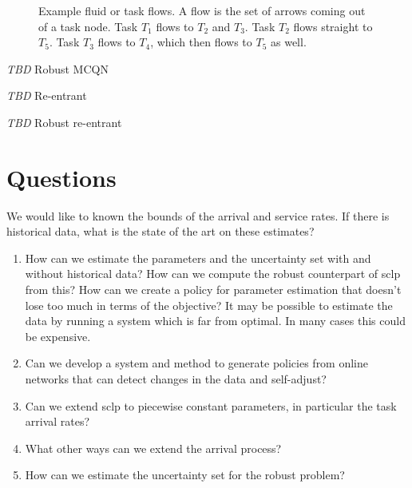 \documentclass[11pt,a4paper,titlepage]{article}
\newcommand\tbd{{\color{orange}\textit{TBD}}}
\theoremstyle{definition}
\begin{document}
\begin{figure}
    \centering
    \caption[Example fluid or task flows.]{
        \label{fig:task-flows}
        Example fluid or task flows.
        A flow is the set of arrows coming out of a task node.
        Task $T_1$ flows to $T_2$ and $T_3$.
        Task $T_2$ flows straight to $T_5$.
        Task $T_3$ flows to $T_4$,
        which then flows to $T_5$ as well.
    }
\end{figure}

\tbd{} Robust MCQN

\tbd{} Re-entrant

\tbd{} Robust re-entrant

\section{Questions}
\label{sec:questions}

We would like to known the bounds of the arrival and service rates.
If there is historical data,
what is the state of the art on these estimates?

\begin{enumerate}
    \item How can we estimate the parameters and the uncertainty set with and
    without historical data?
    How can we compute the robust counterpart of \gls{sclp} from this?
    How can we create a policy for parameter estimation that doesn't lose too
    much in terms of the objective?
    It may be possible to estimate the data by running a system which is far
    from optimal.
    In many cases this could be expensive.
    \item Can we develop a system and method to generate policies from online
    networks that can detect changes in the data and self-adjust?
    \item Can we extend \gls{sclp} to piecewise constant parameters,
    in particular the task arrival rates?
    \item What other ways can we extend the arrival process?
    \item How can we estimate the uncertainty set for the robust problem?
\end{enumerate}

\printbibliography
\label{sec:bibliography}
\end{document}
